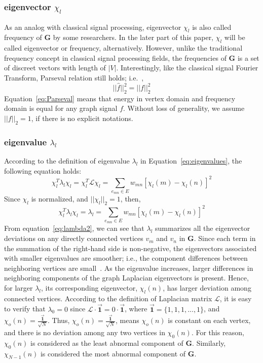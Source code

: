 \documentclass[conference]{IEEEtran}
\begin{document}
\subsubsection{eigenvector $\chi_l$}
As an analog with classical signal processing, eigenvector $\chi_l$ is also called frequency of $\mathbf{G}$ by some researchers. In the later part of this paper, $\chi_l$ will be called eigenvector or frequency, alternatively. However, unlike the traditional frequency concept in classical signal processing fields, the frequencies of $\mathbf{G}$ is a set of discreet vectors with length of $|V|$. Interestingly, like the classical signal Fourier Transform, Parseval relation still holds; i.e.~\cite{shuman2015vertex},
\begin{equation}
\label{eq:Parseval}
||\hat{f}||_2^2=||f||_2^2
\end{equation}
Equation~\ref{eq:Parseval} means that energy in vertex domain and frequency domain is equal for any graph signal $f$. Without loss of generality, we assume $||f||_2 =1$, if there is no explicit notations.

\subsubsection{eigenvalue $\lambda_l$}
According to the definition of eigenvalue $\lambda_l$  in Equation~\ref{eq:eigenvalues}, the following equation holds:
\begin{equation}
\label{eq:lambda1}
\chi_{l}^T\lambda_{l}\chi_{l}=\chi_{l}^T\mathcal{L}\chi_{l}= \sum_{e_{mn}\in E} w_
{mn}[\chi_{l}(m)-\chi_{l}(n)]^2
\end{equation}Since $\chi_{l}$ is normalized, and $||\chi_{l}||_2 =1$, then,
\begin{equation}
\label{eq:lambda2}
\chi_{l}^T\lambda_{l}\chi_{l}=\lambda_l= \sum_{e_{mn}\in E} w_
{mn}[\chi_{l}(m)-\chi_{l}(n)]^2
\end{equation}
From equation~\ref{eq:lambda2}, we can see that $\lambda_l$ summarizes all the eigenvector deviations on any directly connected vertices $v_m$ and $v_n$ in $\mathbf{G}$. Since each term in the summation of the right-hand side is non-negative, the eigenvectors associated with smaller eigenvalues are smoother; i.e., the component differences between neighboring vertices are
small~\cite{shuman2015vertex}. As the eigenvalue increases, larger differences in neighboring
components of the graph Laplacian eigenvectors is present.
Hence, for larger $\lambda_l$, its corresponding eigenvector, $\chi_l(n)$, has larger deviation among connected vertices. According to the definition of Laplacian matrix $\mathcal{L}$, it is easy to verify that $\lambda_0=0$ since $\mathcal{L}\cdot\vec{\textbf{1}}= 0\cdot\vec{\textbf{1}}$, where $\vec{\textbf{1}}=\{1,1,1,...,1\}$, and $\chi_o(n)=\frac{\vec{\textbf{1}}}{\sqrt{N}}$. Thus, $\chi_o(n)=\frac{\vec{\textbf{1}}}{\sqrt{N}}$, means $\chi_o(n)$ is constant on each vertex, and there is no deviation among any two vertices in $\chi_0(n)$. For this reason, $\chi_0(n)$ is considered as the least abnormal component of $\mathbf{G}$. Similarly, $\chi_{N-1}(n)$ is considered the most abnormal component of $\mathbf{G}$.
\end{document}
